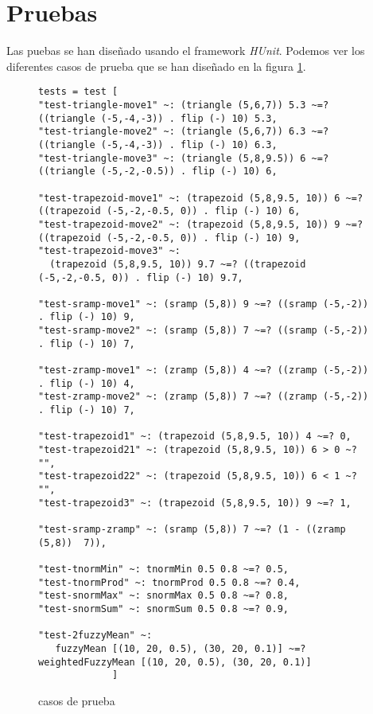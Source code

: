 \section{Pruebas}
Las puebas se han diseñado usando el framework \emph{HUnit}. Podemos
ver los diferentes casos de prueba que se han diseñado en la figura \ref{code:codigo13}.

\begin{figure}
\begin{lstlisting}
tests = test [ 
"test-triangle-move1" ~: (triangle (5,6,7)) 5.3 ~=? ((triangle (-5,-4,-3)) . flip (-) 10) 5.3,
"test-triangle-move2" ~: (triangle (5,6,7)) 6.3 ~=? ((triangle (-5,-4,-3)) . flip (-) 10) 6.3,
"test-triangle-move3" ~: (triangle (5,8,9.5)) 6 ~=? ((triangle (-5,-2,-0.5)) . flip (-) 10) 6,

"test-trapezoid-move1" ~: (trapezoid (5,8,9.5, 10)) 6 ~=? ((trapezoid (-5,-2,-0.5, 0)) . flip (-) 10) 6,
"test-trapezoid-move2" ~: (trapezoid (5,8,9.5, 10)) 9 ~=? ((trapezoid (-5,-2,-0.5, 0)) . flip (-) 10) 9,
"test-trapezoid-move3" ~: 
  (trapezoid (5,8,9.5, 10)) 9.7 ~=? ((trapezoid (-5,-2,-0.5, 0)) . flip (-) 10) 9.7,

"test-sramp-move1" ~: (sramp (5,8)) 9 ~=? ((sramp (-5,-2)) . flip (-) 10) 9,
"test-sramp-move2" ~: (sramp (5,8)) 7 ~=? ((sramp (-5,-2)) . flip (-) 10) 7,

"test-zramp-move1" ~: (zramp (5,8)) 4 ~=? ((zramp (-5,-2)) . flip (-) 10) 4,
"test-zramp-move2" ~: (zramp (5,8)) 7 ~=? ((zramp (-5,-2)) . flip (-) 10) 7,

"test-trapezoid1" ~: (trapezoid (5,8,9.5, 10)) 4 ~=? 0,
"test-trapezoid21" ~: (trapezoid (5,8,9.5, 10)) 6 > 0 ~? "",
"test-trapezoid22" ~: (trapezoid (5,8,9.5, 10)) 6 < 1 ~? "",
"test-trapezoid3" ~: (trapezoid (5,8,9.5, 10)) 9 ~=? 1,

"test-sramp-zramp" ~: (sramp (5,8)) 7 ~=? (1 - ((zramp (5,8))  7)),

"test-tnormMin" ~: tnormMin 0.5 0.8 ~=? 0.5,
"test-tnormProd" ~: tnormProd 0.5 0.8 ~=? 0.4,
"test-snormMax" ~: snormMax 0.5 0.8 ~=? 0.8,
"test-snormSum" ~: snormSum 0.5 0.8 ~=? 0.9,

"test-2fuzzyMean" ~: 
   fuzzyMean [(10, 20, 0.5), (30, 20, 0.1)] ~=? weightedFuzzyMean [(10, 20, 0.5), (30, 20, 0.1)]
             ]
\end{lstlisting}
\caption{casos de prueba}
\label{code:codigo13}
\end{figure}